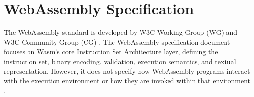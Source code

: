 \section{WebAssembly Specification}
\label{sec:wasm-specification}

The \gls{WebAssembly} standard is developed by W3C Working Group (WG) and W3C Community Group (CG) \cite{webassemblycommunitygroup_2023_webassembly}. The WebAssembly specification document \cite{webassemblycommunitygroup_2023_webassembly} focuses on Wasm's core Instruction Set Architecture layer, defining the instruction set, binary encoding, validation, execution semantics, and textual representation. However, it does not specify how WebAssembly programs interact with the execution environment or how they are invoked within that environment \cite{webassemblycommunitygroup_2023_webassembly}.

